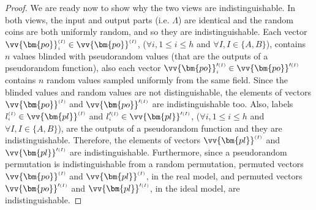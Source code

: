 \begin{proof}
We are ready now to show why the two views are indistinguishable.  In both views, the input and output parts (i.e. $\Lambda$) are identical and the random coins are both uniformly
random, and so they are indistinguishable. Each vector  $\vv{\bm{po}}^{\scriptscriptstyle (I)}_{\scriptscriptstyle i}\in \vv{\bm{po}}^{\scriptscriptstyle (I)}$, ($\forall i, 1\leq i\leq h$ and $\forall I, I\in \{A,B\}$), contains $n$ values blinded with  pseudorandom values (that are the outputs of a pseudorandom function), also each vector  $\vv{\bm{po}}'^{\scriptscriptstyle (I)}_{\scriptscriptstyle i}\in \vv{\bm{po}}'^{\scriptscriptstyle (I)}$ contains $n$ random values sampled uniformly from the same field. Since the blinded values and random values are not distinguishable, the elements of vectors $\vv{\bm{po}}^{\scriptscriptstyle (I)}$ and $\vv{\bm{po}}'^{\scriptscriptstyle (I)}$ are indistinguishable  too. Also,  labels  $l^{\scriptscriptstyle (I)}_{\scriptscriptstyle i} \in \vv{\bm{pl}}^{\scriptscriptstyle (I)}$ and $l'^{\scriptscriptstyle (I)}_{\scriptscriptstyle i} \in \vv{\bm{pl}}'^{\scriptscriptstyle (I)}$, ($\forall i, 1\leq i\leq h$ and $\forall I, I\in \{A,B\}$), are the outputs of a pseudorandom function and they are indistinguishable. Therefore, the elements of vectors $\vv{\bm{pl}}^{\scriptscriptstyle (I)}$ and $\vv{\bm{pl}}'^{\scriptscriptstyle (I)}$ are indistinguishable. Furthermore, since a pseudorandom permutation is indistinguishable from a  random permutation,  permuted vectors $\vv{\bm{po}}^{\scriptscriptstyle (I)}$ and $\vv{\bm{pl}}^{\scriptscriptstyle (I)} $, in the real model, and permuted vectors $\vv{\bm{po}}'^{\scriptscriptstyle (I)}$ and $\vv{\bm{pl}}'^{\scriptscriptstyle (I)} $, in the ideal model, are indistinguishable.



\end{proof}

